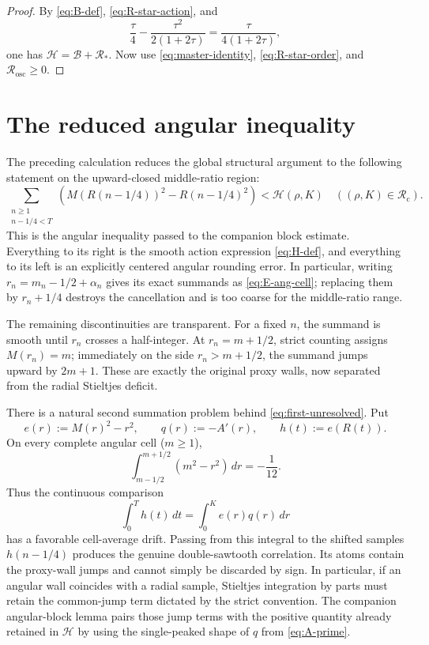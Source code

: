 \documentclass[11pt]{article}
\theoremstyle{remark}
\begin{document}
\begin{proof}
By \eqref{eq:B-def}, \eqref{eq:R-star-action}, and
\[
 \frac\tau4-\frac{\tau^2}{2(1+2\tau)}
 =\frac{\tau}{4(1+2\tau)},
\]
one has $\mathcal H=\mathcal B+\mathcal R_*$.  Now use
\eqref{eq:master-identity},
\eqref{eq:R-star-order}, and $\mathcal R_{\mathrm{osc}}\geq0$.
\end{proof}

\section{The reduced angular inequality}

The preceding calculation reduces the global structural argument to the
following statement on the upward-closed middle-ratio region:
\begin{equation}
 \boxed{
 \sum_{\substack{n\geq1\\n-1/4<T}}
 \left(
 M(R(n-1/4))^2-R(n-1/4)^2
 \right)
 <\mathcal H(\rho,K)
 }
 \quad ((\rho,K)\in\mathcal R_{\mathrm c}).
 \label{eq:first-unresolved}
\end{equation}
This is the angular inequality passed to the companion block estimate.
Everything to its right is the smooth action expression \eqref{eq:H-def},
and everything to its left is an explicitly centered angular rounding
error.  In
particular, writing $r_n=m_n-1/2+\alpha_n$ gives its exact summands as
\eqref{eq:E-ang-cell}; replacing them by $r_n+1/4$ destroys the
cancellation and is too coarse for the middle-ratio range.

The remaining discontinuities are transparent.  For a fixed $n$, the
summand is smooth until $r_n$ crosses a half-integer.  At
$r_n=m+1/2$, strict counting assigns $M(r_n)=m$; immediately on the side
$r_n>m+1/2$, the summand jumps upward by $2m+1$.  These are exactly the
original proxy walls, now separated from the radial Stieltjes deficit.

There is a natural second summation problem behind
\eqref{eq:first-unresolved}.  Put
\begin{equation}
 e(r):=M(r)^2-r^2,
 \qquad q(r):=-A'(r),
 \qquad h(t):=e(R(t)).
 \label{eq:second-sawtooth-data}
\end{equation}
On every complete angular cell ($m\geq1$),
\begin{equation}
 \int_{m-1/2}^{m+1/2}(m^2-r^2)\,dr=-\frac1{12}.
 \label{eq:negative-cell-mean}
\end{equation}
Thus the continuous comparison
\[
 \int_0^T h(t)\,dt=\int_0^K e(r)q(r)\,dr
\]
has a favorable cell-average drift.  Passing from this integral to the
shifted samples $h(n-1/4)$ produces the genuine double-sawtooth
correlation.  Its atoms contain the proxy-wall jumps and cannot simply be
discarded by sign.  In particular, if an angular wall coincides with a
radial sample, Stieltjes integration by parts must retain the common-jump
term dictated by the strict convention.  The companion angular-block lemma
pairs those jump terms with the positive quantity already retained in
$\mathcal H$ by using the single-peaked shape of $q$ from
\eqref{eq:A-prime}.
\end{document}
